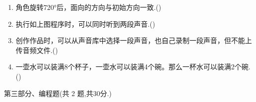 \documentclass[10pt, a4paper]{article}
\begin{document}
\begin{enumerate}
        
        \item 角色旋转720°后，面向的方向与初始方向一致.(\qquad)
        
        \item 执行如上图程序时，可以同时听到两段声音.(\qquad)
        
        \item 创作作品时，可以从声音库中选择一段声音，也自己录制一段声音，但不能上传音频文件.(\qquad)
        
        \item 一壶水可以装满8个杯子，一壶水可以装满4个碗。那么一杯水可以装满2个碗.(\qquad)
           
    \end{enumerate}

    \newpage
    {\noindent\heiti 第三部分、编程题(共 2 题,共30分.)}
\end{document}
